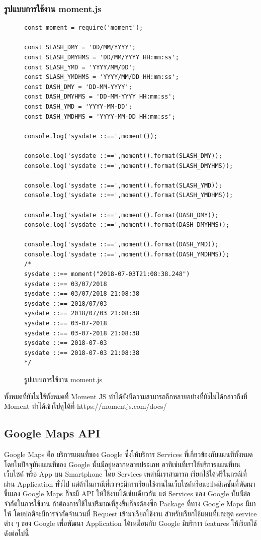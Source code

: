 \subsubsection{รูปแบบการใช้งาน moment.js}
	\begin{figure}[H]
		{\begin{lstlisting}
const moment = require('moment');

const SLASH_DMY = 'DD/MM/YYYY';
const SLASH_DMYHMS = 'DD/MM/YYYY HH:mm:ss';
const SLASH_YMD = 'YYYY/MM/DD';
const SLASH_YMDHMS = 'YYYY/MM/DD HH:mm:ss';
const DASH_DMY = 'DD-MM-YYYY';
const DASH_DMYHMS = 'DD-MM-YYYY HH:mm:ss';
const DASH_YMD = 'YYYY-MM-DD';
const DASH_YMDHMS = 'YYYY-MM-DD HH:mm:ss';
			
console.log('sysdate ::==',moment());
			
console.log('sysdate ::==',moment().format(SLASH_DMY));
console.log('sysdate ::==',moment().format(SLASH_DMYHMS));
			
console.log('sysdate ::==',moment().format(SLASH_YMD));
console.log('sysdate ::==',moment().format(SLASH_YMDHMS));
			
console.log('sysdate ::==',moment().format(DASH_DMY));
console.log('sysdate ::==',moment().format(DASH_DMYHMS));
			
console.log('sysdate ::==',moment().format(DASH_YMD));
console.log('sysdate ::==',moment().format(DASH_YMDHMS));
/*
sysdate ::== moment("2018-07-03T21:08:38.248")
sysdate ::== 03/07/2018
sysdate ::== 03/07/2018 21:08:38
sysdate ::== 2018/07/03
sysdate ::== 2018/07/03 21:08:38
sysdate ::== 03-07-2018
sysdate ::== 03-07-2018 21:08:38
sysdate ::== 2018-07-03
sysdate ::== 2018-07-03 21:08:38
*/
		\end{lstlisting}}
	\centering
		\caption{รูปแบบการใช้งาน moment.js}
		\label{Fig:howtomomentjs}
	\end{figure}

ทั้งหมดที่ยังไม่ใช้ทั้งหมดที่ Moment JS ทำได้ยังมีความสามารถอีกหลายอย่างที่ยังไม่ได้กล่าวถึงที่ Moment ทำได้เข้าไปดูได้ที่ https://momentjs.com/docs/

\subsection{Google Maps API}

Google Maps คือ บริการแผนที่ของ Google ซึ่งให้บริการ Services ที่เกี่ยวข้องกับแผนที่ทั้งหมด โดยในปัจจุบันแผนที่ของ Google
นั้นมีอยู่หลากหลายประเภท อาทิเช่นที่เราใช้บริการแผนที่บนเว็บไซต์ หรือ App บน Smartphone โดย Services เหล่านี้เราสามารถ
เรียกใช้ได้ฟรีในกรณีที่ผ่าน Application ทั่วไป แต่ถ้าในกรณีที่เราจะมีการเรียกใช้งานในเว็บไซต์หรือแอปพลิเคชันที่พัฒนาขึ้นเอง Google Maps 
ก็จะมี API ให้ใช้งานได้เช่นเดียวกัน แต่ Services ของ Google นั้นมีข้อจำกัดในการใช้งาน ถ้าต้องการใช้ในปริมาณที่สูงขึ้นก็จะต้องซื้อ Package 
ที่ทาง Google Maps มีมาให้ โดยปกติจะมีการจำกัดจำนวนที่ Request เข้ามาเรียกใช้งาน สำหรับเรียกใช้แผนที่และชุด service ต่าง ๆ ของ Google 
เพื่อพัฒนา Application ได้เหมือนกับ Google มีบริการ features ให้เรียกใช้ดังต่อไปนี้

